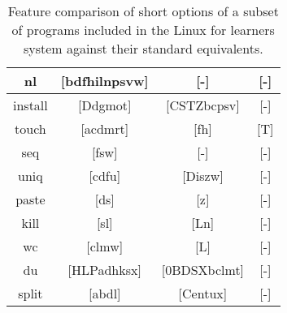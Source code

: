\begin{table}[H]
\begin{center}
\begin{tabular}{|c|c|c|c|}
            \hline
            nl & [bdfhilnpsvw] & [-] & [-] \\
            \hline
            install & [Ddgmot] & [CSTZbcpsv] & [-] \\
            \hline
            touch & [acdmrt] & [fh] & [T] \\
            \hline
            seq & [fsw] & [-] & [-] \\
            \hline
            uniq & [cdfu] & [Diszw] & [-] \\
            \hline
            paste & [ds] & [z] & [-] \\
            \hline
            kill & [sl] & [Ln] & [-] \\ 
            \hline
            wc & [clmw] & [L] & [-] \\
            \hline
            du & [HLPadhksx] & [0BDSXbclmt] & [-] \\
            \hline
            split & [abdl] & [Centux] & [-] \\
            \hline
        \end{tabular}
    \end{center}
    \caption{Feature comparison of short options of a subset of programs included in the Linux for learners system against their standard equivalents.}
\end{table}
